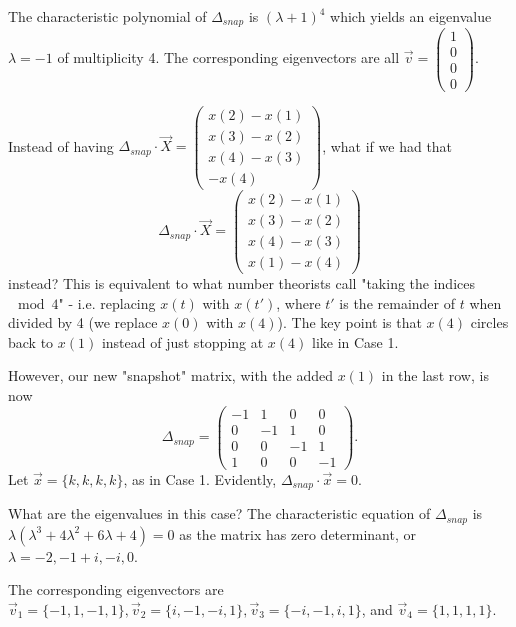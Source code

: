 \documentclass[a4paper, 12pt,oneside,openany]{book}
\begin{document}
The characteristic polynomial of $\Delta_{snap}$ is $(\lambda+1)^4$ which yields an eigenvalue $\lambda=-1$ of multiplicity 4. The corresponding eigenvectors are all $\vec{v} = \begin{pmatrix} 1\\0\\0\\0\end{pmatrix}$.

 Instead of having $\Delta_{snap} \cdot \vec{X} = \begin{pmatrix} x(2)-x(1) \\ x(3)-x(2) \\ x(4)-x(3) \\ -x(4) \end{pmatrix}$, what if we had that $$\Delta_{snap} \cdot \vec{X} = \begin{pmatrix} x(2)-x(1) \\ x(3)-x(2) \\ x(4)-x(3) \\ x(1)-x(4) \end{pmatrix}$$ instead? This is equivalent to what number theorists call "taking the indices $\mod 4$" - i.e. replacing $x(t)$ with $x(t')$, where $t'$ is the remainder of $t$ when divided by 4 (we replace $x(0)$ with $x(4)$). The key point is that $x(4)$ circles back to $x(1)$ instead of just stopping at $x(4)$ like in Case 1. 

However, our new "snapshot" matrix, with the added $x(1)$ in the last row, is now $$\Delta_{snap} = \begin{pmatrix} -1&1&0&0 \\ 0&-1&1&0 \\ 0&0&-1&1 \\ 1&0&0&-1 \end{pmatrix}.$$ Let $\vec{x}=\{k, k, k, k\}$, as in Case 1. Evidently, $\Delta_{snap} \cdot \vec{x}=0$. 

What are the eigenvalues in this case? The characteristic equation of $\Delta_{snap}$ is $\lambda(\lambda^3+4\lambda^2+6\lambda+4)=0$ as the matrix has zero determinant, or $\lambda=-2, -1+i, -i, 0$. 

The corresponding eigenvectors are $\vec{v}_1=\{-1, 1, -1, 1\}, \vec{v}_2 = \{i, -1, -i, 1\}, \vec{v}_3 = \{-i, -1, i, 1\}$, and $\vec{v}_4 = \{1,1,1,1\}$.
\end{document}
